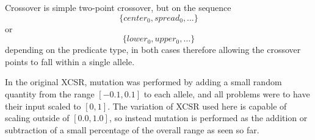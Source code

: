 \newpage
Crossover is simple two-point crossover, but on the sequence
\begin{equation}
\{center_0,spread_0, \ldots\}
\end{equation}
or
\begin{equation}
\{lower_0,upper_0, \ldots\}
\end{equation}
depending on the predicate type,
in both cases therefore allowing the crossover points to fall within a single allele.

In the original XCSR, mutation was performed by adding a small random quantity from the range $[-0.1,0.1]$ to each allele, and all problems were to have their input scaled to $[0,1]$.
The variation of XCSR used here is capable of scaling outside of $[0.0,1.0]$, so instead mutation is performed as the addition or subtraction of a small percentage of the overall range as seen so far.

